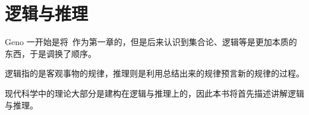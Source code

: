 \chapter{逻辑与推理}\label{ch:LogicAndInference}
    \small{Geno 一开始是将~作为第一章的，但是后来认识到集合论、逻辑等是更加本质的东西，于是调换了顺序。}

    逻辑指的是客观事物的规律，推理则是利用总结出来的规律预言新的规律的过程。

    现代科学中的理论大部分是建构在逻辑与推理上的，因此本书将首先描述讲解逻辑与推理。
